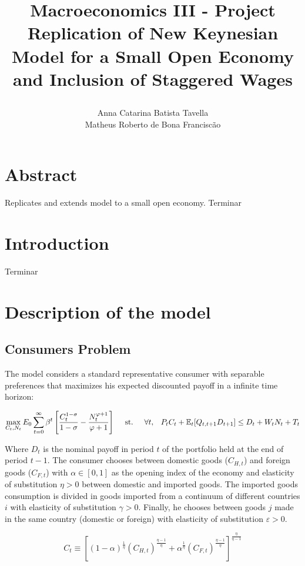 \documentclass{article}
\title{\large{\textbf{Macroeconomics III - Project}} \\
\LARGE{Replication of New Keynesian Model for a Small Open Economy and Inclusion of Staggered Wages }
\author{Anna Catarina Batista Tavella\\Matheus Roberto de Bona Franciscão}}
\date{}
\newcommand{\Et}{\mathbb{E}_t}
\begin{document}
\maketitle

\section*{Abstract}
Replicates and extends \cite{gali_monacelli} model to a small open economy. Terminar

\section{Introduction}
Terminar

\section{Description of the model}

\subsection{Consumers Problem}
The model considers a standard representative consumer with separable preferences that maximizes his expected discounted payoff in a infinite time horizon:

\begin{equation}
    \max_{C_t, N_t} E_0 \sum^\infty_{t=0} \beta^t \left[\frac{C_t^{1-\sigma}}{1-\sigma} - \frac{N_t^{\varphi+1}}{\varphi+1} \right] \hspace{1em}  \textrm{ st. } \hspace{1em} \forall t, \hspace{0.8em} P_t C_t + \Et[Q_{t,t+1} D_{t+1}] \leq D_t +  W_t N_t + T_t
\end{equation}

Where $D_t$ is the nominal payoff in period $t$ of the portfolio held at the end of period $t-1$. The consumer chooses between domestic goods ($C_{H,t}$) and foreign goods ($C_{F,t}$) with $\alpha \in [0,1]$ as the opening index of the economy and elasticity of substitution $\eta > 0$ between domestic and imported goods. The imported goods consumption is divided in goods imported from a continuum of different countries $i$ with elasticity of substitution $\gamma > 0$. Finally, he chooses between goods $j$ made in the same country (domestic or foreign) with elasticity of substitution $\varepsilon > 0$.

\begin{equation}
    C_t \equiv \left[ (1-\alpha)^{\frac{1}{\eta}} (C_{H,t})^{\frac{\eta-1}{\eta}} + \alpha^{\frac{1}{\eta}} (C_{F,t})^{\frac{\eta-1}{\eta}} \right]^{\frac{\eta}{\eta-1}}
\end{equation}
\end{document}

